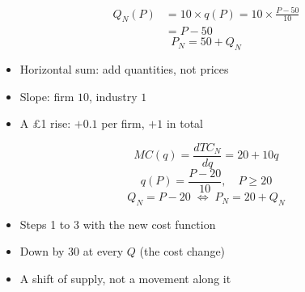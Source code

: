 \documentclass{beamer}
\begin{document}
\begin{frame}[plain,label=w2_wt1_industry]
  \Large
  \begin{align*}
    \tag{2}\;Q_N(P) &= 10 \times q(P) = 10 \times \frac{P - 50}{10}\\
                    &= P - 50
  \end{align*}
  \[
    \tag{3}\;P_N = 50 + Q_N
  \]

  \vspace{0.5em}
  \begin{itemize}\Large
    \item Horizontal sum: add quantities, not prices
    \item Slope: firm $10$, industry $1$
    \item A \pounds 1 rise: $+0.1$ per firm, $+1$ in total
  \end{itemize}
\end{frame}

\begin{frame}[plain,label=w2_wt2_innovation]
  \Large
  \[
    \tag{4}\;MC(q) = \frac{dTC_N}{dq} = 20 + 10q
  \]
  \[
    \tag{5}\;q(P) = \frac{P - 20}{10}, \quad P \ge 20
  \]
  \[
    \tag{6}\;Q_N = P - 20 \;\Leftrightarrow\; P_N = 20 + Q_N
  \]

  \vspace{0.5em}
  \begin{itemize}\Large
    \item Steps 1 to 3 with the new cost function
    \item Down by $30$ at every $Q$ (the cost change)
    \item A shift of supply, not a movement along it
  \end{itemize}
\end{frame}
\end{document}
